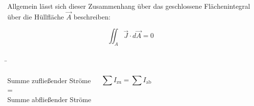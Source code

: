 \begin{frame}
{\begin{figure}[h!]
	\centering
	\s{}
	
	\label{fig:huell}
\end{figure}

Allgemein lässt sich dieser Zusammenhang über das geschlossene Flächenintegral über die Hüllfläche $\vec{A}$ beschreiben:

\begin{equation}
	\iint_A \vec{J} \cdot d\vec{A} = 0 
\end{equation}



	

	

	
	}
	
	\b{
	
	\begin{columns}

		\vspace{-20pt}
			\begin{Merksatz}{}
				\begin{center}
					Summe zufließender Ströme\\

			        =\\

					Summe abfließender Ströme\\
				\end{center}
	
			\end{Merksatz}


			

		

			\begin{equation*}
					\sum I_\mathrm{zu} = \sum I_\mathrm{ab}
			\end{equation*}

		\phantom{.}\\

		


\end{columns}}
\end{frame}

